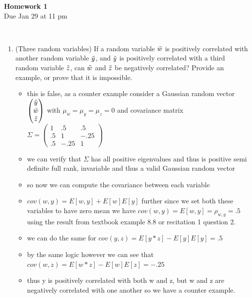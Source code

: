 \documentclass[12pt,twoside]{article}
\begin{document}
\begin{center}
{\large{\textbf{Homework 1}} } \vspace{0.2cm}\\
Due Jan 29 at 11 pm
\\
\end{center}
\\

\begin{enumerate}

\item (Three random variables) If a random variable $\tilde{ w }$ is positively correlated with another random variable $\tilde{ y }$, and $\tilde{ y }$ is positively correlated with a third random variable $\tilde{ z }$, can $\tilde{ w }$ and $\tilde{ z }$ be negatively correlated? Provide an example, or prove that it is impossible.
\begin{itemize}
    \item this is false, as a counter example consider a Gaussian random vector $\begin{pmatrix} \tilde{ y }\\ \tilde{ w }\\ \tilde{ z }\end{pmatrix}$ with $\mu_{w}=\mu_{y}=\mu_{z}=0$ and covariance matrix $\Sigma=\begin{pmatrix}
        1&.5&.5\\
        .5 & 1 & -.25\\
        .5 & -.25 &1
    \end{pmatrix}$
    \item we can verify that $\Sigma$ has all positive eigenvalues and thus is positive semi definite full rank, invariable and thus a valid Gaussian random vector 
    \item  so now we can compute the covariance between each variable 
    \item $cov(w,y)=E[w,y]+E[w]E[y]$ further since we set both these variables to have zero mean we have $cov(w,y)=E[w,y]=\rho_{w,y}=.5$ using the result from textbook example 8.8 or recitation 1 question 2. 
    \item we can do the same for $cov(y,z)=E[y*z]-E[y]E[y]=.5$
    \item by the same logic however we can see that $cov(w,z)=E[w*z]-E[w]E[z]=-.25$ 
    \item thus y is positively correlated with both w and z, but w and z are negatively correlated with one another so we have a counter example. 
\end{itemize}


\end{enumerate}
\end{document}

